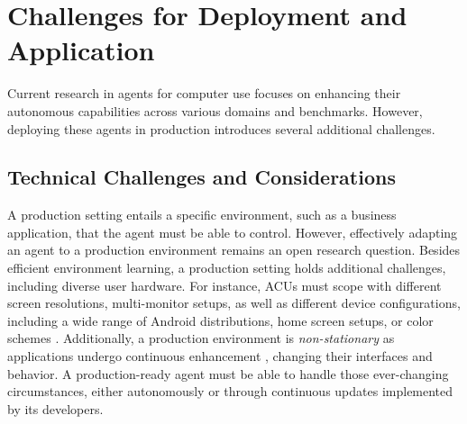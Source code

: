 
\section{Challenges for Deployment and Application} \label{sec:considerations_production}

Current research in agents for computer use focuses on enhancing their autonomous capabilities across various domains and benchmarks. However, deploying these agents in production introduces several additional challenges. 

\subsection{Technical Challenges and Considerations} \label{sec:cp-technical-challenges}

A production setting entails a specific environment, such as a business application, that the agent must be able to control.
However, effectively adapting an agent to a production environment remains an open research question.
Besides efficient environment learning, a production setting holds additional challenges, including diverse user hardware. For instance, ACUs must scope with different screen resolutions, multi-monitor setups, as well as different device configurations, including a wide range of Android distributions, home screen setups, or color schemes \citep{lee_benchmarking_2024}.
Additionally, a production environment is \emph{non-stationary} as applications undergo continuous enhancement \citep{humble_continuous_2011}, changing their interfaces and behavior.
A production-ready agent must be able to handle those ever-changing circumstances, either autonomously or through continuous updates implemented by its developers.

